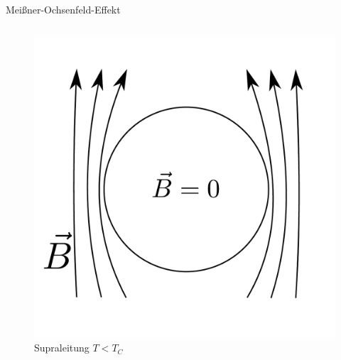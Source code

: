 \begin{frame}{Meißner-Ochsenfeld-Effekt}
\begin{columns}
\begin{column}{0.49\textwidth}
\begin{figure}
    \includegraphics[width = \textwidth]{supra_2.pdf}
    \caption{Supraleitung $T < T_{C}$}
    \label{}
  \end{figure}
\end{column}
\end{columns}
\end{frame}
